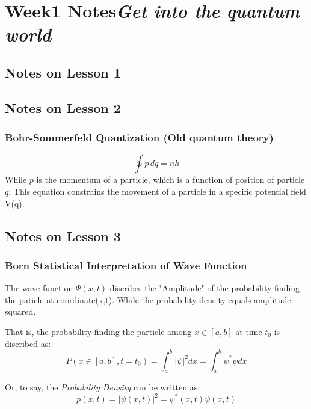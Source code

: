 \section{Week1 Notes\hfill\normalsize\textit{Get into the quantum world}}\SectionRule
    \subsection{Notes on Lesson 1}
    \subsection{Notes on Lesson 2}
    \subsubsection{Bohr-Sommerfeld Quantization (Old quantum theory)}
    \[
        \oint p \,dq = nh
    \]
    While $p$ is the momentum of a particle, which is a function of position of particle $q$. This equation constrains the movement of a particle in a specific potential field V(q).
    \subsection{Notes on Lesson 3}
    \subsubsection{Born Statistical Interpretation of Wave Function}
    The wave function $\Psi (x,t)$ discribes the "Amplitude" of the probability finding the paticle at coordinate(x,t). While the probability density equals amplitude squared.

    That is, the probability finding the particle among $x\in [a,b]$ at time $t_0$ is discribed as:
    \begin{equation*}
        P(x\in [a,b],t=t_0)=\int^{b}_{a}|\psi|^{2}dx=\int^{b}_{a}\psi^*\psi dx
    \end{equation*}

    Or, to say, the \textit{Probability Density} can be written as:
    \begin{equation*}
        p(x,t)=|\psi(x,t)|^2=\psi^{*}(x,t)\psi(x,t)
    \end{equation*}